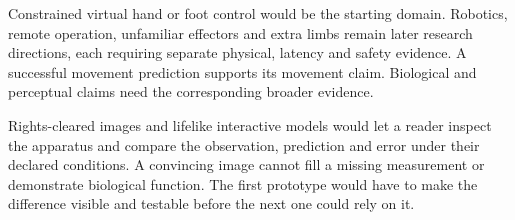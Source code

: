 Constrained virtual hand or foot control would be the starting domain. Robotics,
remote operation, unfamiliar effectors and extra limbs remain later research
directions, each requiring separate physical, latency and safety evidence.
A successful movement prediction supports its movement claim. Biological and
perceptual claims need the corresponding broader evidence.

Rights-cleared images and lifelike interactive models would let a reader inspect
the apparatus and compare the observation, prediction and error under their
declared conditions. A convincing image cannot fill a missing measurement or
demonstrate biological function. The first prototype would have to make the
difference visible and testable before the next one could rely on it.
